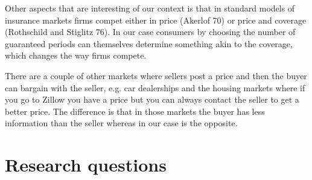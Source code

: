 \documentclass[12pt]{article}
\theoremstyle{plain}
\theoremstyle{plain}
\begin{document}
Other aspects that are interesting of our context is that in standard models of insurance markets firms compet either in price (Akerlof 70) or price and coverage (Rothschild and Stiglitz 76). In our case consumers by choosing the number of guaranteed periods can themselves determine something akin to the coverage, which changes the way firms compete.  


There are a couple of other markets where sellers post a price and then the buyer can bargain with the seller, e.g. car dealerships and the housing markets where if you go to Zillow you have a price but you can always contact the seller to get a better price. The difference is that in those markets the buyer has less information than the seller whereas in our case is the opposite.  

\section{Research questions}
\end{document}
